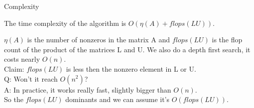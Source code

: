 \documentclass[9pt]{beamer}
\newcommand{\ccr}[1]{{\color{red}#1}}
\newcommand{\ccb}[1]{{\color{blue}#1}}
\newcommand{\cco}[1]{{\color{orange}#1}}
\begin{document}
	\begin{frame}{Complexity}
		\begin{theorem}
			The time complexity of the algorithm is \ccb{$O(\eta(A)+flops(LU))$}. 
		\end{theorem}
		\ccb{$\eta(A)$} is the number of nonzeros in the matrix A and \ccb{$flops(LU)$} is the flop count of the product of the matrices L and U. We also do a depth first search, it costs nearly \ccb{$O(n)$}.\\ \pause
		\cco{Claim}: \ccb{$flops(LU)$} is less then the nonzero element in L or U.\\ \pause\bigskip
		\ccr{Q}: Won't it reach \ccb{$O(n^2)$}?\\ \pause
		\cco{A}: In practice, it works really fast, slightly bigger than \ccb{$O(n)$}.\\ \pause\bigskip
		So the \ccb{$flops(LU)$} dominants and we can assume it's \ccb{$O(flops(LU))$}.
	\end{frame}
\end{document}
